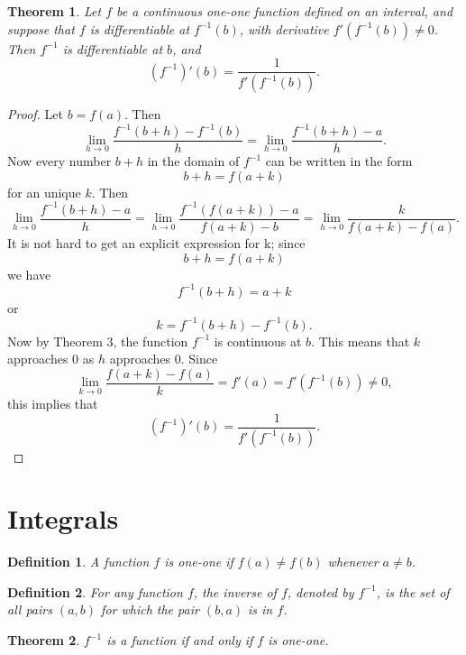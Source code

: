 \documentclass{article}
\numberwithin{corollary}{subsection}
\newtheorem{definition}{Definition}
\numberwithin{definition}{subsection}
\numberwithin{lemma}{subsection}
\newtheorem{theorem}{Theorem}
\numberwithin{theorem}{subsection}
\begin{document}
\begin{theorem}
  Let $f$ be a continuous one-one function defined on an interval, and suppose
  that $f$ is differentiable at $f^{-1}(b)$, with derivative $f'(f^{-1}(b))
  \neq 0$. Then $f^{-1}$ is differentiable at $b$, and \[
    (f^{-1})'(b) = \frac{1}{f'(f^{-1}(b))}.
  \]
\end{theorem}
\begin{proof}
  Let $b = f(a)$. Then \[
    \lim_{h \to 0} \frac{f^{-1}(b + h) - f^{-1}(b)}{h}
    = \lim_{h \to 0} \frac{f^{-1}(b + h) - a}{h}.
  \] Now every number $b + h$ in the domain of $f^{-1}$ can be written in the
  form \[
    b + h = f(a + k)
  \] for an unique $k$. Then \[
    \lim_{h \to 0} \frac{f^{-1}(b + h) - a}{h}
    = \lim_{h \to 0} \frac{f^{-1}(f(a + k)) - a}{f(a + k) - b}
    = \lim_{h \to 0} \frac{k}{f(a + k) - f(a)}.
  \] It is not hard to get an explicit expression for k; since \[
    b + h = f(a + k)
  \] we have \[
    f^{-1}(b + h) = a + k
  \] or \[
    k = f^{-1}(b + h) - f^{-1}(b).
  \] Now by Theorem 3, the function $f^{-1}$ is continuous at $b$. This means
  that $k$ approaches 0 as $h$ approaches 0. Since \[
    \lim_{k \to 0} \frac{f(a + k) - f(a)}{k} = f'(a) = f'(f^{-1}(b)) \neq 0,
  \] this implies that \[
    (f^{-1})'(b) = \frac{1}{f'(f^{-1}(b))}.
  \]
\end{proof}

\section{Integrals}

\begin{definition}
  A function $f$ is \emph{one-one} if $f(a) \neq f(b)$ whenever $a \neq b$.
\end{definition}

\begin{definition}
  For any function $f$, the \emph{inverse} of $f$, denoted by $f^{-1}$, is the
  set of all pairs $(a, b)$ for which the pair $(b, a)$ is in $f$.
\end{definition}

\begin{theorem}
  $f^{-1}$ is a function if and only if $f$ is one-one.
\end{theorem}
\end{document}
